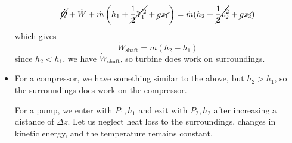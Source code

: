 \begin{itemize}
\begin{example}
        \begin{equation}
            \cancel{\dot{Q}} + \dot{W} + \dot{m}\left(h_1+\cancel{\frac{1}{2}V_1^2}+\cancel{gz_1}\right)=\dot{m}(h_2+\cancel{\frac{1}{2}v_2^2}+\cancel{gz_2})
        \end{equation}
        which gives 
        \begin{equation}
            \dot{W}_\text{shaft} = \dot{m}(h_2-h_1)
        \end{equation}
        since $h_2<h_1$, we have $\dot{W}_\text{shaft}$, so turbine does work on surroundings.
    \end{example}
    \item For a compressor, we have something similar to the above, but $h_2>h_1$, so the surroundings does work on the compressor.
    \begin{example}
        For a pump, we enter with $P_1,h_1$ and exit with $P_2,h_2$ after increasing a distance of $\Delta z$. Let us neglect heat loss to the surroundings, changes in kinetic energy, and the temperature remains constant.
        \vspace{2mm}


\end{example}
\end{itemize}
